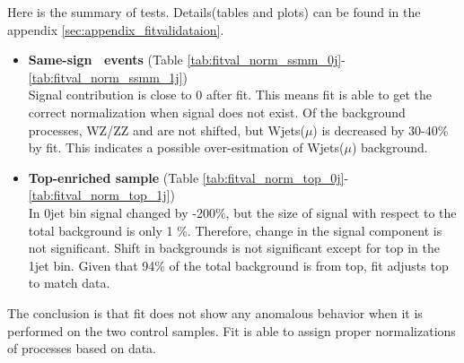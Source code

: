 Here is the summary of tests. Details(tables and plots) can be found in the appendix \ref{sec:appendix_fitvalidataion}. 
\begin{itemize}
    \item{\textbf{Same-sign \M\M~events} (Table \ref{tab:fitval_norm_ssmm_0j}-\ref{tab:fitval_norm_ssmm_1j}) \\ }  
        Signal contribution is close to 0 after fit. This means fit is able to 
        get the correct normalization when signal does not exist. Of the background 
        processes, WZ/ZZ and \Wgstar are not shifted, but Wjets($\mu$) is decreased by 30-40\% by fit.   
        This indicates a possible over-esitmation of Wjets($\mu$) background.  
    \item{\textbf{Top-enriched sample} (Table \ref{tab:fitval_norm_top_0j}-\ref{tab:fitval_norm_top_1j}) \\ } 
        In 0jet bin signal changed by -200\%, but the size of signal with respect to the total background 
        is only 1 \%. Therefore, change in the signal component is not significant. 
        Shift in backgrounds is not significant except for top in the 1jet bin. 
        Given that 94\% of the total background is from top, fit adjusts top to match data.  
\end{itemize} 

The conclusion is that fit does not show any anomalous behavior
when it is performed on the two control samples. Fit is able to assign 
proper normalizations of processes based on data.   


